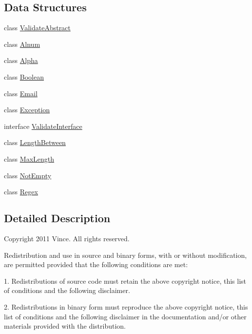 \subsection*{Data Structures}
\begin{DoxyCompactItemize}
\item 
class \hyperlink{class_anemo_1_1_validate_1_1_adapter_1_1_validate_abstract}{ValidateAbstract}
\item 
class \hyperlink{class_anemo_1_1_validate_1_1_adapter_1_1_alnum}{Alnum}
\item 
class \hyperlink{class_anemo_1_1_validate_1_1_adapter_1_1_alpha}{Alpha}
\item 
class \hyperlink{class_anemo_1_1_validate_1_1_adapter_1_1_boolean}{Boolean}
\item 
class \hyperlink{class_anemo_1_1_validate_1_1_adapter_1_1_email}{Email}
\item 
class \hyperlink{class_anemo_1_1_validate_1_1_adapter_1_1_exception}{Exception}
\item 
interface \hyperlink{interface_anemo_1_1_validate_1_1_adapter_1_1_validate_interface}{ValidateInterface}
\item 
class \hyperlink{class_anemo_1_1_validate_1_1_adapter_1_1_length_between}{LengthBetween}
\item 
class \hyperlink{class_anemo_1_1_validate_1_1_adapter_1_1_max_length}{MaxLength}
\item 
class \hyperlink{class_anemo_1_1_validate_1_1_adapter_1_1_not_empty}{NotEmpty}
\item 
class \hyperlink{class_anemo_1_1_validate_1_1_adapter_1_1_regex}{Regex}
\end{DoxyCompactItemize}


\subsection{Detailed Description}
Copyright 2011 Vince. All rights reserved.

Redistribution and use in source and binary forms, with or without modification, are permitted provided that the following conditions are met:

1. Redistributions of source code must retain the above copyright notice, this list of conditions and the following disclaimer.

2. Redistributions in binary form must reproduce the above copyright notice, this list of conditions and the following disclaimer in the documentation and/or other materials provided with the distribution.

